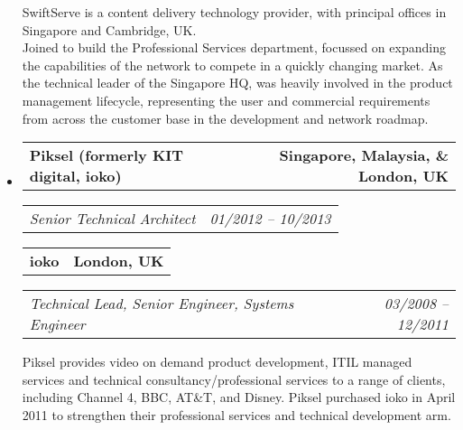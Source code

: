 \documentclass[10pt,a4paper]{article}
\makeatletter
\newcommand{\headerrow}[2]
{\begin{tabular*}{\linewidth}{l@{\extracolsep{\fill}}r}
    #1 &
    #2 \\
\end{tabular*}}
\makeatother
\begin{document}
\begin{itemize}
            SwiftServe is a content delivery technology provider, with principal offices in Singapore and Cambridge, UK.
            \\
            Joined to build the Professional Services department, focussed on expanding the capabilities of the network to compete in a quickly changing market. As the technical leader of the Singapore HQ, was heavily involved in the product management lifecycle, representing the user and commercial requirements from across the customer base in the development and network roadmap.
            

    \item
    \headerrow
        {\textbf{Piksel (formerly KIT digital, ioko)}}
        {\textbf{Singapore, Malaysia, \& London, UK}}
    \headerrow
        {\emph{Senior Technical Architect}}
        {\emph{01/2012 -- 10/2013}}
    \headerrow
        {\textbf{ioko}}
        {\textbf{London, UK}}   
    \headerrow
        {\emph{Technical Lead, Senior Engineer, Systems Engineer}}
        {\emph{03/2008 -- 12/2011}}

    Piksel provides video on demand product development, ITIL managed services and technical consultancy/professional services to a range of clients, including Channel 4, BBC, AT\&T, and Disney. Piksel purchased ioko in April 2011 to strengthen their professional services and technical development arm.    


\end{itemize}
\end{document}
